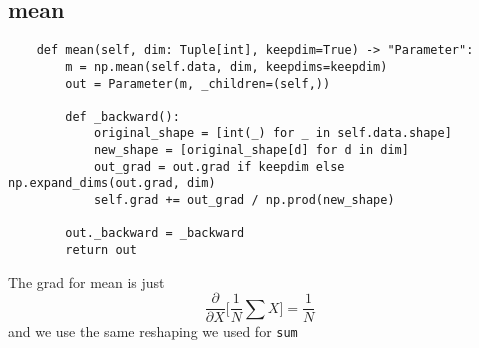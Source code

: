 \documentclass[11pt]{article}
\begin{document}
\subsection{mean}
\begin{verbatim}
    def mean(self, dim: Tuple[int], keepdim=True) -> "Parameter":
        m = np.mean(self.data, dim, keepdims=keepdim)
        out = Parameter(m, _children=(self,))

        def _backward():
            original_shape = [int(_) for _ in self.data.shape]
            new_shape = [original_shape[d] for d in dim]
            out_grad = out.grad if keepdim else np.expand_dims(out.grad, dim)
            self.grad += out_grad / np.prod(new_shape)

        out._backward = _backward
        return out
\end{verbatim}
The grad for mean is just
\begin{equation}
  \frac{\partial}{\partial X} \big[\frac{1}{N}\sum{X}\big]= \frac{1}{N} 
\end{equation}
and we use the same reshaping we used for \texttt{sum}
\end{document}

